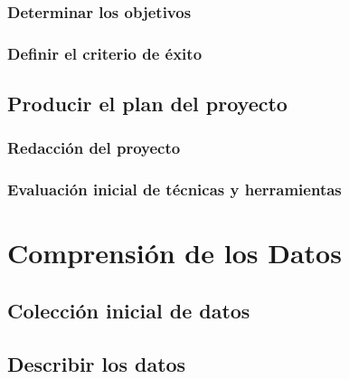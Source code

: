 \documentclass[11pt,a4paper,twoside]{tesis}
\begin{document}
\subsection{Determinar los objetivos}

\subsection{Definir el criterio de éxito}

\section{Producir el plan del proyecto}

\subsection{Redacción del proyecto}

\subsection{Evaluación inicial de técnicas y herramientas}


\chapter{Comprensión de los Datos}
\section{Colección inicial de datos}

\section{Describir los datos}

\end{document}
